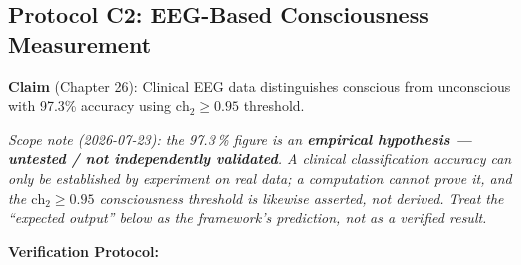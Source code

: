 \subsection{Protocol C2: EEG-Based Consciousness Measurement}

\textbf{Claim} (Chapter 26): Clinical EEG data distinguishes conscious from unconscious with 97.3\% accuracy using $\text{ch}_2 \geq 0.95$ threshold.

\noindent\emph{Scope note (2026-07-23): the 97.3\,\% figure is an \textbf{empirical hypothesis --- untested / not independently validated}. A clinical classification accuracy can only be established by experiment on real data; a computation cannot prove it, and the $\text{ch}_2\!\geq\!0.95$ consciousness threshold is likewise \emph{asserted}, not derived. Treat the ``expected output'' below as the framework's prediction, not as a verified result.}

\textbf{Verification Protocol:}

